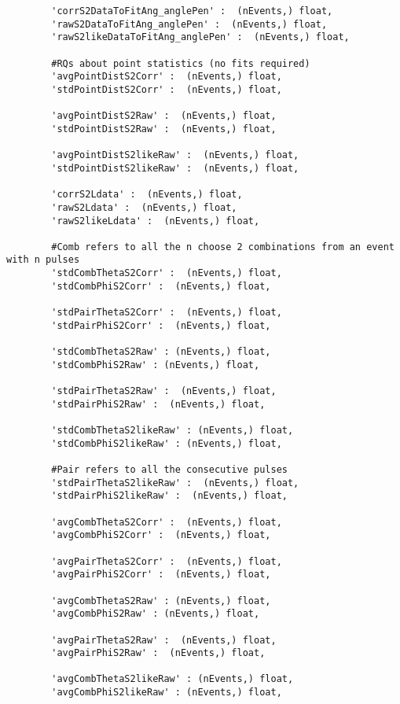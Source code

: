\begin{verbatim}
        'corrS2DataToFitAng_anglePen' :  (nEvents,) float, 
        'rawS2DataToFitAng_anglePen' :  (nEvents,) float, 
        'rawS2likeDataToFitAng_anglePen' :  (nEvents,) float, 
        
        #RQs about point statistics (no fits required)
        'avgPointDistS2Corr' :  (nEvents,) float,
        'stdPointDistS2Corr' :  (nEvents,) float,
        
        'avgPointDistS2Raw' :  (nEvents,) float,
        'stdPointDistS2Raw' :  (nEvents,) float,
        
        'avgPointDistS2likeRaw' :  (nEvents,) float,
        'stdPointDistS2likeRaw' :  (nEvents,) float,
        
        'corrS2Ldata' :  (nEvents,) float, 
        'rawS2Ldata' :  (nEvents,) float,
        'rawS2likeLdata' :  (nEvents,) float,
        
        #Comb refers to all the n choose 2 combinations from an event with n pulses
        'stdCombThetaS2Corr' :  (nEvents,) float, 
        'stdCombPhiS2Corr' :  (nEvents,) float, 
        
        'stdPairThetaS2Corr' :  (nEvents,) float, 
        'stdPairPhiS2Corr' :  (nEvents,) float, 
        
        'stdCombThetaS2Raw' : (nEvents,) float,
        'stdCombPhiS2Raw' : (nEvents,) float,
        
        'stdPairThetaS2Raw' :  (nEvents,) float,
        'stdPairPhiS2Raw' :  (nEvents,) float,
        
        'stdCombThetaS2likeRaw' : (nEvents,) float,
        'stdCombPhiS2likeRaw' : (nEvents,) float,
        
        #Pair refers to all the consecutive pulses
        'stdPairThetaS2likeRaw' :  (nEvents,) float,
        'stdPairPhiS2likeRaw' :  (nEvents,) float,
        
        'avgCombThetaS2Corr' :  (nEvents,) float, 
        'avgCombPhiS2Corr' :  (nEvents,) float, 
        
        'avgPairThetaS2Corr' :  (nEvents,) float, 
        'avgPairPhiS2Corr' :  (nEvents,) float, 
        
        'avgCombThetaS2Raw' : (nEvents,) float,
        'avgCombPhiS2Raw' : (nEvents,) float,
        
        'avgPairThetaS2Raw' :  (nEvents,) float,
        'avgPairPhiS2Raw' :  (nEvents,) float,
        
        'avgCombThetaS2likeRaw' : (nEvents,) float,
        'avgCombPhiS2likeRaw' : (nEvents,) float,
        

\end{verbatim}
